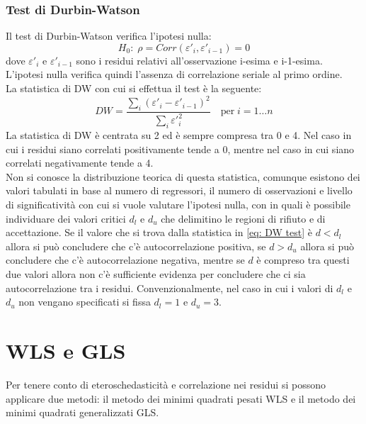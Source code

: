 \subsubsection{Test di Durbin-Watson}
Il test di Durbin-Watson verifica l'ipotesi nulla:
\begin{equation}
H_0:\; \rho = Corr(\varepsilon'_i, \varepsilon'_{i-1}) = 0
\end{equation}
dove $\varepsilon'_i$ e $\varepsilon'_{i-1}$ sono i residui relativi all'osservazione i-esima e i-1-esima. L'ipotesi nulla verifica quindi l'assenza di correlazione seriale al primo ordine. \\
La statistica di DW con cui si effettua il test è la seguente:
\begin{equation}
DW = \frac{\sum_{i}(\varepsilon'_i - \varepsilon'_{i-1})^2}{\sum_{i} \varepsilon'^2_{i}} \quad \text{per}\; i = 1 \dots n
\label{eq: DW test}
\end{equation}
La statistica di DW è centrata su 2 ed è sempre compresa tra 0 e 4. Nel caso in cui i residui siano correlati positivamente tende a 0, mentre nel caso in cui siano correlati negativamente tende a 4.\\
Non si conosce la distribuzione teorica di questa statistica, comunque esistono dei valori tabulati in base al numero di regressori, il numero di osservazioni e livello di significatività con cui si vuole valutare l'ipotesi nulla, con in quali è possibile individuare dei valori critici $d_l$ e $d_u$ che delimitino le regioni di rifiuto e di accettazione. Se il valore che si trova dalla statistica in \eqref{eq: DW test} è $d < d_l$ allora si può concludere che c'è autocorrelazione positiva, se $d > d_u$ allora si può concludere che c'è autocorrelazione negativa, mentre se $d$ è compreso tra questi due valori allora non c'è sufficiente evidenza per concludere che ci sia autocorrelazione tra i residui. Convenzionalmente, nel caso in cui i valori di $d_l$ e $d_u$ non vengano specificati si fissa $d_l = 1$ e $d_u = 3$.
\section{WLS e GLS}
Per tenere conto di eteroschedasticità e correlazione nei residui si possono applicare due metodi: il metodo dei minimi quadrati pesati WLS e il metodo dei minimi quadrati generalizzati GLS.
